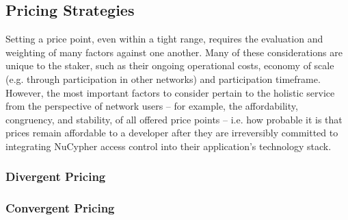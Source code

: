 \documentclass[longbibliography,nofootinbib]{revtex4-1}
\begin{document}
\subsection{Pricing Strategies}

Setting a price point, even within a tight range, requires the evaluation and weighting of many factors against one another. Many of these considerations are unique to the staker, such as their ongoing operational costs, economy of scale (e.g. through participation in other networks) and participation timeframe. However, the most important factors to consider pertain to the holistic service from the perspective of network users – for example, the affordability, congruency, and stability, of all offered price points – i.e. how probable it is that prices remain affordable to a developer after they are irreversibly committed to integrating NuCypher access control into their application’s technology stack.

\subsubsection{Divergent Pricing}

\subsubsection{Convergent Pricing}




\end{document}
